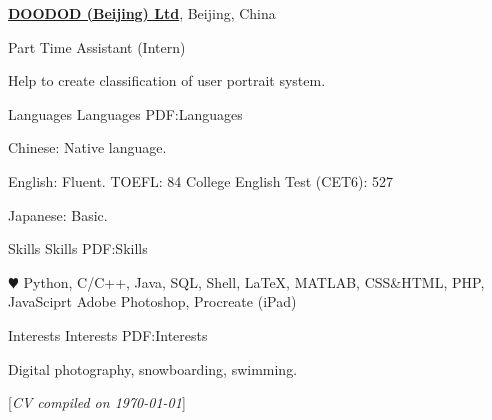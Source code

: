 \documentclass[a4paper,MMMyyyy,nonstopmode]{simpleresumecv}
\newcommand{\CVNote}{CV compiled on {\today}}
\begin{document}
\begin{Body}
    \Entry
    \href{https://www.doodod.com/}
    {\textbf{DOODOD (Beijing) Ltd}},
    Beijing, China

    \Gap
    \BulletItem
    Part Time Assistant (Intern)
    \hfill
    \begin{Detail}
        \SubBulletItem
        Help to create classification of user portrait system.
    \end{Detail}


    \Section
    {Languages}
    {Languages}
    {PDF:Languages}

    \BulletItem
    Chinese: Native language.

    \Gap
    \BulletItem
    English: Fluent.
    \SubBulletItem
    [\DatestampYMD{2020}{12}{06}]
    TOEFL: 84
    \SubBulletItem
    [\DatestampYMD{2019}{06}{01}]
    College English Test  (CET6): 527

    \Gap
    \BulletItem
    Japanese: Basic.


    \Section
    {Skills}
    {Skills}
    {PDF:Skills}

    \Entry
    \BulletItem
    {\color{black} $\varheart$} Python,
    C/C++,
    Java,
    SQL,
    Shell,
    {\LaTeX},
    MATLAB,
    CSS\&HTML,
    PHP,
    JavaSciprt
    \BulletItem
    Adobe Photoshop,
    Procreate (iPad)


    \Section
    {Interests}
    {Interests}
    {PDF:Interests}

    \Entry
    Digital photography,
    snowboarding,
    swimming.



\end{Body}


\BigGap
\UseNoteFont%
\null\hfill%
[\textit{\CVNote}]
\end{document}
